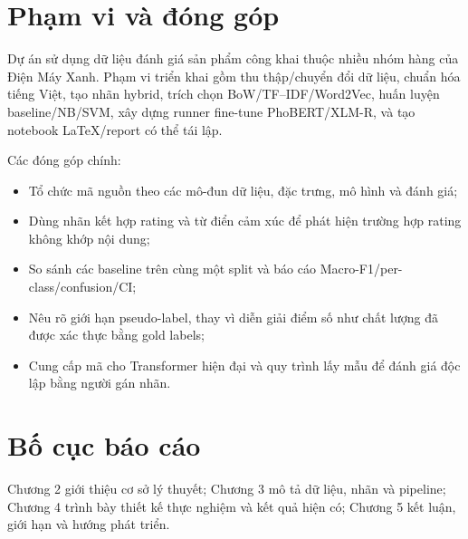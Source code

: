 \section{Phạm vi và đóng góp}
Dự án sử dụng dữ liệu đánh giá sản phẩm công khai thuộc nhiều nhóm hàng của Điện Máy Xanh. Phạm vi triển khai gồm thu thập/chuyển đổi dữ liệu, chuẩn hóa tiếng Việt, tạo nhãn hybrid, trích chọn BoW/TF--IDF/Word2Vec, huấn luyện baseline/NB/SVM, xây dựng runner fine-tune PhoBERT/XLM-R, và tạo notebook LaTeX/report có thể tái lập.

Các đóng góp chính:
\begin{itemize}
  \item Tổ chức mã nguồn theo các mô-đun dữ liệu, đặc trưng, mô hình và đánh giá;
  \item Dùng nhãn kết hợp rating và từ điển cảm xúc để phát hiện trường hợp rating không khớp nội dung;
  \item So sánh các baseline trên cùng một split và báo cáo Macro-F1/per-class/confusion/CI;
  \item Nêu rõ giới hạn pseudo-label, thay vì diễn giải điểm số như chất lượng đã được xác thực bằng gold labels;
  \item Cung cấp mã cho Transformer hiện đại và quy trình lấy mẫu để đánh giá độc lập bằng người gán nhãn.
\end{itemize}

\section{Bố cục báo cáo}
Chương 2 giới thiệu cơ sở lý thuyết; Chương 3 mô tả dữ liệu, nhãn và pipeline; Chương 4 trình bày thiết kế thực nghiệm và kết quả hiện có; Chương 5 kết luận, giới hạn và hướng phát triển.
